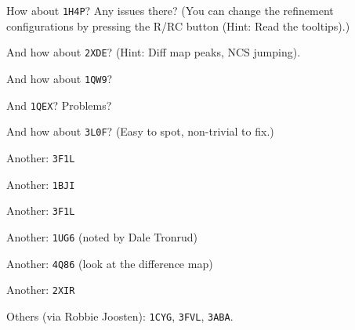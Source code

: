 \documentclass{article}
\begin{document}
How about \texttt{1H4P}?  Any issues there?  (You can change the
refinement configurations by pressing the R/RC button (Hint: Read the tooltips).)




And how about \texttt{2XDE}? %
(Hint: Diff map peaks, NCS jumping).

And how about \texttt{1QW9}?

And \texttt{1QEX}?  Problems?

And how about \texttt{3L0F}? (Easy to spot, non-trivial to
fix.) %

Another: \texttt{3F1L}


Another: \texttt{1BJI}



Another: \texttt{3F1L}

Another: \texttt{1UG6} (noted by Dale Tronrud)

Another: \texttt{4Q86} (look at the difference map)

Another: \texttt{2XIR}


%   


Others (via Robbie Joosten): \texttt{1CYG}, \texttt{3FVL}, \texttt{3ABA}.


\end{document}
